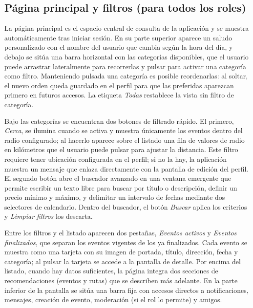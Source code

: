 \clearpage

\subsection{Página principal y filtros (para todos los roles)}

La página principal es el espacio central de consulta de la aplicación y se muestra automáticamente tras iniciar sesión. En su parte superior aparece un saludo personalizado con el nombre del usuario que cambia según la hora del día, y debajo se sitúa una barra horizontal con las categorías disponibles, que el usuario puede arrastrar lateralmente para recorrerlas y pulsar para activar una categoría como filtro. Manteniendo pulsada una categoría es posible reordenarlas: al soltar, el nuevo orden queda guardado en el perfil para que las preferidas aparezcan primero en futuros accesos. La etiqueta \textit{Todas} restablece la vista sin filtro de categoría.

Bajo las categorías se encuentran dos botones de filtrado rápido. El primero, \textit{Cerca}, se ilumina cuando se activa y muestra únicamente los eventos dentro del radio configurado; al hacerlo aparece sobre el listado una fila de valores de radio en kilómetros que el usuario puede pulsar para ajustar la distancia. Este filtro requiere tener ubicación configurada en el perfil; si no la hay, la aplicación muestra un mensaje que enlaza directamente con la pantalla de edición del perfil. El segundo botón abre el buscador avanzado en una ventana emergente que permite escribir un texto libre para buscar por título o descripción, definir un precio mínimo y máximo, y delimitar un intervalo de fechas mediante dos selectores de calendario. Dentro del buscador, el botón \textit{Buscar} aplica los criterios y \textit{Limpiar filtros} los descarta.

Entre los filtros y el listado aparecen dos pestañas, \textit{Eventos activos} y \textit{Eventos finalizados}, que separan los eventos vigentes de los ya finalizados. Cada evento se muestra como una tarjeta con su imagen de portada, título, dirección, fecha y categoría; al pulsar la tarjeta se accede a la pantalla de detalle. Por encima del listado, cuando hay datos suficientes, la página integra dos secciones de recomendaciones (eventos y rutas) que se describen más adelante. En la parte inferior de la pantalla se sitúa una barra fija con accesos directos a notificaciones, mensajes, creación de evento, moderación (si el rol lo permite) y amigos.


